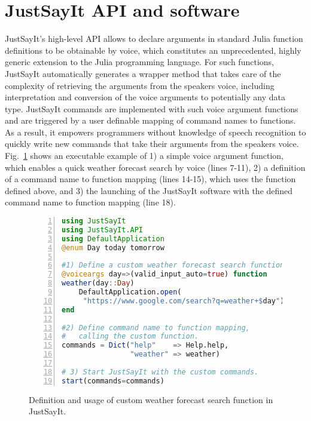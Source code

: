 \documentclass{juliacon}
\begin{document}
\section{JustSayIt API and software}
JustSayIt's high-level API allows to declare arguments in standard Julia function definitions to be obtainable by voice, which constitutes an unprecedented, highly generic extension to the Julia programming language. For such functions, JustSayIt automatically generates a wrapper method that takes care of the complexity of retrieving the arguments from the speakers voice, including interpretation and conversion of the voice arguments to potentially any data type. JustSayIt commands are implemented with such voice argument functions and are triggered by a user definable mapping of command names to functions. As a result, it empowers programmers without knowledge of speech recognition to quickly write new commands that take their arguments from the speakers voice. Fig.~\ref{fig:code-voicearg} shows an executable example of 1) a simple voice argument function, which enables a quick weather forecast search by voice (lines 7-11), 2) a definition of a command name to function mapping (lines 14-15), which uses the function defined above, and 3) the launching of the JustSayIt software with the defined command name to function mapping (line 18).

\begin{figure}[t]
\begin{lstlisting}[language = Julia, numbers=left, numberstyle=\tiny\color{gray}]
using JustSayIt
using JustSayIt.API
using DefaultApplication
@enum Day today tomorrow

#1) Define a custom weather forecast search function
@voiceargs day=>(valid_input_auto=true) function
weather(day::Day)
    DefaultApplication.open(
     "https://www.google.com/search?q=weather+$day")
end

#2) Define command name to function mapping, 
#   calling the custom function.
commands = Dict("help"    => Help.help,
                "weather" => weather)

# 3) Start JustSayIt with the custom commands.
start(commands=commands)

\end{lstlisting}

    \caption{Definition and usage of custom weather forecast search function in JustSayIt.}
	\label{fig:code-voicearg}
\end{figure}
\end{document}

